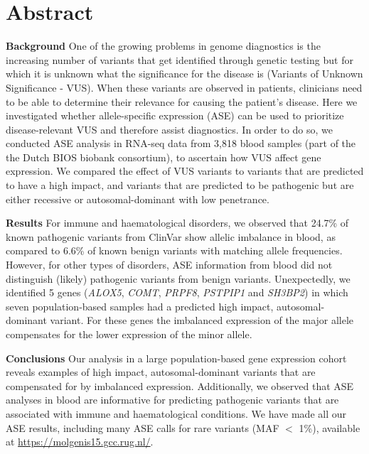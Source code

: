 \newpage

\section*{Abstract}
\textbf{Background} One of the growing problems in genome diagnostics is the increasing number of variants that get identified through genetic testing but for which it is unknown what the significance for the disease is (Variants of Unknown Significance - VUS)\cite{hoffman-andrewsKnownUnknownChallenges2018,direstaNextgenerationSequencingApproach2018}. When these variants are observed in patients, clinicians need to be able to determine their relevance for causing the patient’s disease. Here we investigated whether allele-specific expression (ASE) can be used to prioritize disease-relevant VUS and therefore assist diagnostics. In order  to do so, we conducted ASE analysis in RNA-seq data from 3,818 blood samples (part of the the Dutch BIOS biobank consortium), to ascertain how VUS affect gene expression. We compared the effect of VUS variants to variants that are predicted to have a high impact, and variants that are predicted to be pathogenic but are either recessive or autosomal-dominant with low penetrance.


\textbf{Results} For immune and haematological disorders, we observed that 24.7\% of known pathogenic variants from ClinVar show allelic imbalance in blood, as compared to 6.6\% of known benign variants with matching allele frequencies. However, for other types of disorders, ASE information from blood did not distinguish (likely) pathogenic variants from benign variants. Unexpectedly, we identified 5 genes (\emph{ALOX5}, \emph{COMT}, \emph{PRPF8}, \emph{PSTPIP1} and \emph{SH3BP2}) in which seven population-based samples had a predicted high impact, autosomal-dominant variant. For these genes the imbalanced expression of the major allele compensates for the lower expression of the minor allele.


\textbf{Conclusions} Our analysis in a large population-based gene expression cohort reveals examples of high impact, autosomal-dominant variants that are compensated for by imbalanced expression. Additionally, we observed that ASE analyses in blood are informative for predicting pathogenic variants that  are associated with immune and haematological conditions. We have made all our ASE results, including many ASE calls for rare variants (MAF $<$ 1\%), available at \url{https://molgenis15.gcc.rug.nl/}. 

